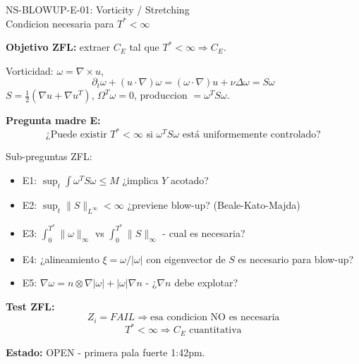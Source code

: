 \documentclass[11pt]{article}
\begin{document}
\begin{center}
{\Large NS-BLOWUP-E-01: Vorticity / Stretching}\\
Condicion necesaria para $T^*<\infty$
\end{center}

\textbf{Objetivo ZFL:} extraer $C_E$ tal que $T^*<\infty\Rightarrow C_E$.

Vorticidad: $\omega=\nabla\times u$,
\[
\partial_t\omega+(u\cdot\nabla)\omega=(\omega\cdot\nabla)u+\nu\Delta\omega=S\omega
\]
$S=\frac12(\nabla u+\nabla u^T)$, $\Omega^T\omega=0$, produccion $=\omega^T S\omega$.

\textbf{Pregunta madre E:}
\[
\boxed{\text{¿Puede existir }T^*<\infty\text{ si }\omega^T S\omega\text{ está uniformemente controlado?}}
\]

Sub-preguntas ZFL:
\begin{itemize}
\item E1: $\sup_t\int \omega^T S\omega \le M$ ¿implica $Y$ acotado?
\item E2: $\sup_t\|S\|_{L^\infty}<\infty$ ¿previene blow-up? (Beale-Kato-Majda)
\item E3: $\int_0^{T^*}\|\omega\|_\infty$ vs $\int_0^{T^*}\|S\|_\infty$ - cual es necesaria?
\item E4: ¿alineamiento $\xi=\omega/|\omega|$ con eigenvector de $S$ es necesario para blow-up?
\item E5: $\nabla\omega=n\otimes\nabla|\omega|+|\omega|\nabla n$ - ¿$\nabla n$ debe explotar?
\end{itemize}

\textbf{Test ZFL:}
\[
\boxed{Z_i=FAIL\Rightarrow\text{esa condicion NO es necesaria}}
\]
\[
\boxed{T^*<\infty\Rightarrow C_E\text{ cuantitativa}}
\]

\textbf{Estado:} OPEN - primera pala fuerte 1:42pm.
\end{document}
